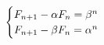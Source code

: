 \documentclass[preview]{standalone}
\begin{document}
\begin{align*}
\special{dvisvgm:raw <g id='unique000'>}\begin{cases}F_{n+1}-\alpha F_n=\beta^n\\F_{n+1}-\beta F_n=\alpha^n\end{cases}\special{dvisvgm:raw </g>}
\end{align*}
\end{document}

